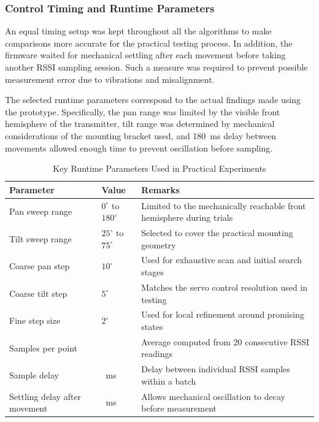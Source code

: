 \subsubsection{Control Timing and Runtime Parameters}

An equal timing setup was kept throughout all the algorithms to make comparisons
more accurate for the practical testing process. In addition, the firmware waited for
mechanical settling after each movement before taking another RSSI sampling session.
Such a measure was required to prevent possible measurement error due to vibrations
and misalignment.

The selected runtime parameters correspond to the actual findings made using the
prototype. Specifically, the pan range was limited by the visible front hemisphere of
the transmitter, tilt range was determined by mechanical considerations of the
mounting bracket used, and 180~ms delay between movements allowed enough time to
prevent oscillation before sampling.

\vspace{0.5cm}
\begin{table}[H]
\centering
\caption{Key Runtime Parameters Used in Practical Experiments}
\label{tab:runtime_parameters}
\renewcommand{\arraystretch}{1.4}
\begin{tabular}{|
>{\raggedright\arraybackslash}p{3.2cm}|
>{\raggedright\arraybackslash}p{3.2cm}|
>{\raggedright\arraybackslash}p{6.2cm}|
}
\hline
\textbf{Parameter} & \textbf{Value} & \textbf{Remarks} \\
\hline
Pan sweep range & $0^{\circ}$ to $180^{\circ}$ & Limited to the mechanically reachable front hemisphere during trials \\
\hline
Tilt sweep range & $25^{\circ}$ to $75^{\circ}$ & Selected to cover the practical mounting geometry \\
\hline
Coarse pan step & $10^{\circ}$ & Used for exhaustive scan and initial search stages \\
\hline
Coarse tilt step & $5^{\circ}$ & Matches the servo control resolution used in testing \\
\hline
Fine step size & $2^{\circ}$ & Used for local refinement around promising states \\
\hline
Samples per point & 20 & Average computed from 20 consecutive RSSI readings \\
\hline
Sample delay & 10~ms & Delay between individual RSSI samples within a batch \\
\hline
Settling delay after movement & 180~ms & Allows mechanical oscillation to decay before measurement \\
\hline
\end{tabular}
\end{table}

